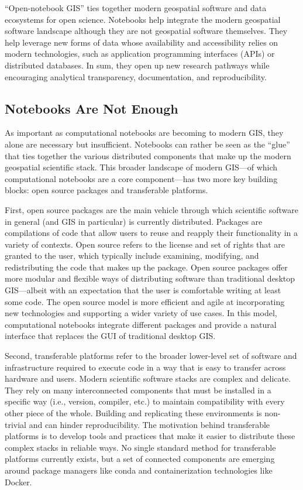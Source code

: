 \documentclass[11pt,letterpaper]{article}
\begin{document}
\enquote{Open-notebook GIS} ties together modern geospatial software and data ecosystems for open science. Notebooks help integrate the modern geospatial software landscape although they are not geospatial software themselves. They help leverage new forms of data whose availability and accessibility relies on modern technologies, such as application programming interfaces (APIs) or distributed databases. In sum, they open up new research pathways while encouraging analytical transparency, documentation, and reproducibility.

\subsection{Notebooks Are Not Enough}

As important as computational notebooks are becoming to modern GIS, they alone are necessary but insufficient. Notebooks can rather be seen as the \enquote{glue} that ties together the various distributed components that make up the modern geospatial scientific stack. This broader landscape of modern GIS---of which computational notebooks are a core component---has two more key building blocks: open source packages and transferable platforms.

First, open source packages are the main vehicle through which scientific software in general (and GIS in particular) is currently distributed. Packages are compilations of code that allow users to reuse and reapply their functionality in a variety of contexts. Open source refers to the license and set of rights that are granted to the user, which typically include examining, modifying, and redistributing the code that makes up the package. Open source packages offer more modular and flexible ways of distributing software than traditional desktop GIS---albeit with an expectation that the user is comfortable writing at least some code. The open source model is more efficient and agile at incorporating new technologies and supporting a wider variety of use cases. In this model, computational notebooks integrate different packages and provide a natural interface that replaces the GUI of traditional desktop GIS.

Second, transferable platforms refer to the broader lower-level set of software and infrastructure required to execute code in a way that is easy to transfer across hardware and users. Modern scientific software stacks are complex and delicate. They rely on many interconnected components that must be installed in a specific way (i.e., version, compiler, etc.) to maintain compatibility with every other piece of the whole. Building and replicating these environments is non-trivial and can hinder reproducibility. The motivation behind transferable platforms is to develop tools and practices that make it easier to distribute these complex stacks in reliable ways. No single standard method for transferable platforms currently exists, but a set of connected components are emerging around package managers like conda and containerization technologies like Docker.
\end{document}
